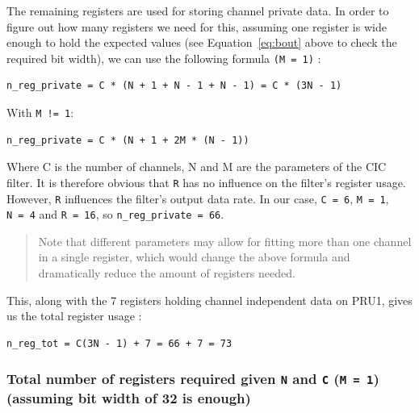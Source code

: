 \documentclass[]{report}
\begin{document}
The remaining registers are used for storing channel private data. In order to figure out how many registers we need for this, assuming one register is wide enough to hold the expected values (see Equation~\ref{eq:bout} above to check the required bit width), we can use the following formula \texttt{(M = 1)} :

\begin{verbatim}
n_reg_private = C * (N + 1 + N - 1 + N - 1) = C * (3N - 1)
\end{verbatim}

With \texttt{M\ !=\ 1}:

\begin{verbatim}
n_reg_private = C * (N + 1 + 2M * (N - 1))
\end{verbatim}

Where C is the number of channels, N and M are the parameters of the CIC
filter. It is therefore obvious that \texttt{R} has no influence on the
filter's register usage. However, \texttt{R} influences the filter's
output data rate. In our case, \texttt{C\ =\ 6}, \texttt{M\ =\ 1},
\texttt{N\ =\ 4} and \texttt{R\ =\ 16}, so
\texttt{n\_reg\_private\ =\ 66}.

\begin{quote}
Note that different parameters may allow for fitting more than one
channel in a single register, which would change the above formula and
dramatically reduce the amount of registers needed.
\end{quote}

This, along with the 7 registers holding channel independent data on
PRU1, gives us the total register usage :

\begin{verbatim}
n_reg_tot = C(3N - 1) + 7 = 66 + 7 = 73
\end{verbatim}

\hypertarget{total-number-of-registers-required-given-n-and-c-m-1-assuming-bit-width-of-32-is-enough}{%
\subsubsection{\texorpdfstring{Total number of registers required given
\texttt{N} and \texttt{C} (\texttt{M\ =\ 1}) (assuming bit width of 32
is
enough)}{Total number of registers required given N and C (M = 1) (assuming bit width of 32 is enough)}}\label{total-number-of-registers-required-given-n-and-c-m-1-assuming-bit-width-of-32-is-enough}}
\end{document}
